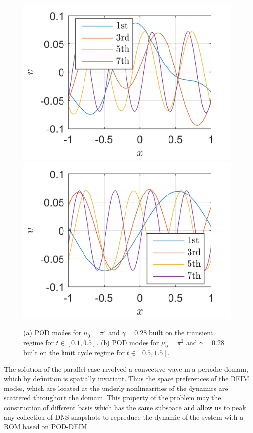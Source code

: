 \documentclass[11pt]{article}
\begin{document}
\begin{figure}
    \centering
    \includegraphics{PODMode1}
    \hfill
    \includegraphics{PODMode2}
    \caption{%
    	    (a) POD modes for  $\mu_0 = \pi^2$ and $\gamma = 0.28$ built on the transient regime for $t\in [0.1, 0.5]$.
        (b) POD modes for  $\mu_0 = \pi^2$ and $\gamma = 0.28$ built on the limit cycle regime for $t\in [0.5, 1.5]$.
    }
    \label{fig:PODmodeparallel}
\end{figure}

The solution of the parallel case involved a convective wave in a periodic domain, which by definition is spatially invariant. Thus the space preferences of the DEIM modes, which are located at the underly nonlinearities of the dynamics are  scattered throughout the domain. This property of the problem may the construction of different basis which has the same subspace and allow us to peak any collection of DNS snapshots to reproduce the dynamic of the system with a ROM based on POD-DEIM.      
\end{document}
